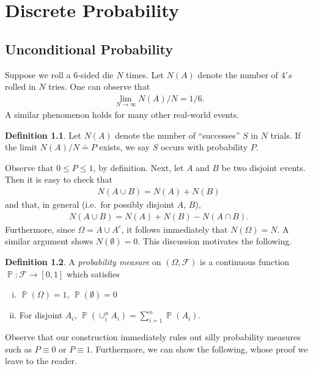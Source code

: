\documentclass[12pt]{amsbook}
\newcommand{\filter}{\mathcal{F}}
\DeclareMathOperator{\prob}{\mathbb{P}}
\theoremstyle{plain}
\theoremstyle{definition}
\newtheorem*{definition}{Definition}
\theoremstyle{remark}
\numberwithin{equation}{section}  %
\begin{document}
\chapter{Discrete Probability}
\section{Unconditional Probability}
Suppose we roll a $6$-sided die $N$ times. Let $N(A)$ denote the number of $4's$
rolled in $N$ tries. One can observe that
\begin{align*}
	\lim_{N \to \infty} N(A)/N = 1/6.
\end{align*}
A similar phenomenon holds for many other real-world events.

\begin{definition}
	Let $N(A)$ denote the number of ``successes'' $S$ in $N$ trials. If the
	limit $N(A)/N \doteq P$ exists, we say $S$ occurs with probability $P$.
\end{definition}
Observe that $ 0 \le P \le 1$, by definition.
Next, let $A$ and $B$ be two disjoint events. Then
it is easy to check that
\begin{align*}
	N(A \cup B) = N(A) + N(B)
\end{align*}
and that, in general (i.e.\ for possibly disjoint $A$, $B$),
\begin{align*}
	N(A \cup B) = N(A) + N(B) - N(A \cap B).
\end{align*}
Furthermore, since $\Omega = A \cup A^c$, it follows immediately
that $N(\Omega) = N$. A similar argument shows $N(\emptyset) = 0$.
This discussion motivates the following.
\begin{definition}
	A \emph{probability measure} on $(\Omega, \filter)$ is a continuous function
	$\prob: \filter \to [0,1]$ which satisfies
	\begin{enumerate}[(i)]
		\item
			$\prob(\Omega) = 1$, $\prob(\emptyset) = 0$
		\item
			For disjoint $A_i$, $\prob(\cup_i^n A_i) = \sum_{i = 1}^n 
			\prob(A_i)$.
	\end{enumerate}
\end{definition}
Observe that our construction immediately rules out silly probability
measures such as $P \equiv 0$ or $P \equiv 1$. Furthermore,
we can show the following, whose proof we leave to the reader.
\end{document}
